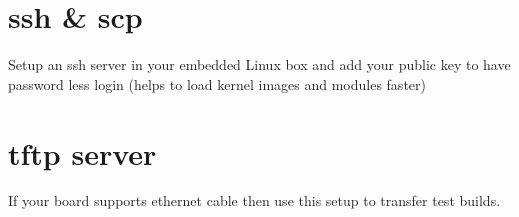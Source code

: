 \documentclass[letterpaper,10pt,english]{sphinxmanual}
\begin{document}
\section{ssh \& scp}
\label{embedded-linux:ssh-scp}
Setup an ssh server in your embedded Linux box and add your public key to have
password less login (helps to load kernel images and modules faster)


\section{tftp server}
\label{embedded-linux:tftp-server}
If your board supports ethernet cable then use this setup to transfer test builds.



\renewcommand{\indexname}{Index}
\printindex
\end{document}
